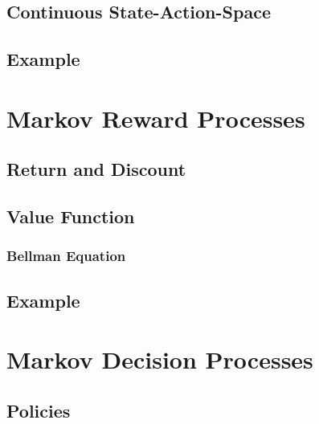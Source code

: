         \subsection{Continuous State-Action-Space} %

        \subsection{Example} %

    \section{Markov Reward Processes} %

        \subsection{Return and Discount} %

        \subsection{Value Function} %

            \subsubsection{Bellman Equation} %

        \subsection{Example} %

    \section{Markov Decision Processes} %

        \subsection{Policies} %

